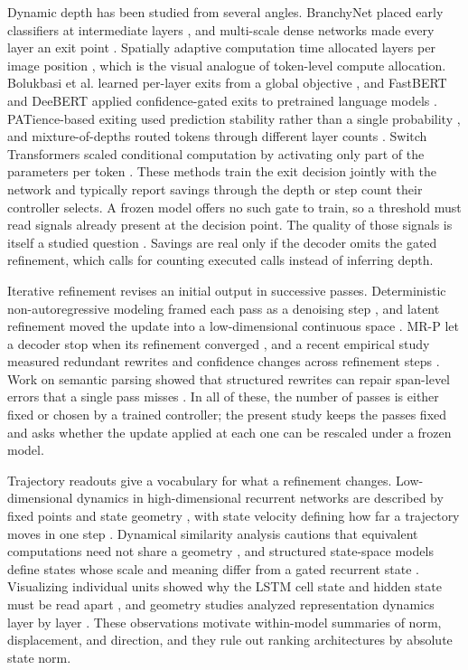 \documentclass[11pt]{article}
\begin{document}
Dynamic depth has been studied from several angles. BranchyNet placed early classifiers at intermediate layers \citep{teerapittayanon2016branchynet}, and multi-scale dense networks made every layer an exit point \citep{huang2018multiscale}. Spatially adaptive computation time allocated layers per image position \citep{figurnov2017spatially}, which is the visual analogue of token-level compute allocation. Bolukbasi et al. learned per-layer exits from a global objective \citep{bolukbasi2017adaptive}, and FastBERT and DeeBERT applied confidence-gated exits to pretrained language models \citep{liu2020fastbert,xin2020deebert}. PATience-based exiting used prediction stability rather than a single probability \citep{zhou2020patience}, and mixture-of-depths routed tokens through different layer counts \citep{raposo2024mixture}. Switch Transformers scaled conditional computation by activating only part of the parameters per token \citep{fedus2022switch}. These methods train the exit decision jointly with the network and typically report savings through the depth or step count their controller selects. A frozen model offers no such gate to train, so a threshold must read signals already present at the decision point. The quality of those signals is itself a studied question \citep{jiang2018trust,tian2023calibration}. Savings are real only if the decoder omits the gated refinement, which calls for counting executed calls instead of inferring depth.

Iterative refinement revises an initial output in successive passes. Deterministic non-autoregressive modeling framed each pass as a denoising step \citep{lee2018deterministic}, and latent refinement moved the update into a low-dimensional continuous space \citep{lee2020iterative}. MR-P let a decoder stop when its refinement converged \citep{cheng2022mrp}, and a recent empirical study measured redundant rewrites and confidence changes across refinement steps \citep{xiao2025empirical}. Work on semantic parsing showed that structured rewrites can repair span-level errors that a single pass misses \citep{geng2021rewrite}. In all of these, the number of passes is either fixed or chosen by a trained controller; the present study keeps the passes fixed and asks whether the update applied at each one can be rescaled under a frozen model.

Trajectory readouts give a vocabulary for what a refinement changes. Low-dimensional dynamics in high-dimensional recurrent networks are described by fixed points and state geometry \citep{sussillo2013blackbox,vyas2020population}, with state velocity defining how far a trajectory moves in one step \citep{haviv2019memory}. Dynamical similarity analysis cautions that equivalent computations need not share a geometry \citep{ostrow2023dsa}, and structured state-space models define states whose scale and meaning differ from a gated recurrent state \citep{gu2022s4,gu2023mamba}. Visualizing individual units showed why the LSTM cell state and hidden state must be read apart \citep{karpathy2015rnn}, and geometry studies analyzed representation dynamics layer by layer \citep{horoi2020geometry}. These observations motivate within-model summaries of norm, displacement, and direction, and they rule out ranking architectures by absolute state norm.
\end{document}
